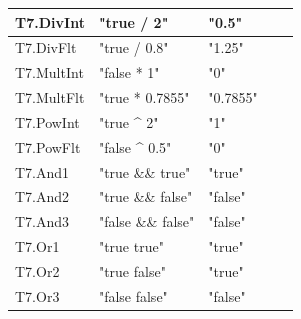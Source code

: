 \documentclass[a4paper, oneside, 11pt]{report}
\begin{document}
\begin{tabular}{|p{1.5in}|p{1.5in}|p{1.6in}|p{1.6in}|p{2.4in}|}
        \hline
        T7.DivInt                         & "true / 2"                              & "0.5"         &                \\
        \hline
        T7.DivFlt                         & "true / 0.8"                            & "1.25"        &                \\
        \hline
        T7.MultInt                        & "false * 1"                             & "0"           &                \\
        \hline
        T7.MultFlt                        & "true * 0.7855"                         & "0.7855"      &                \\
        \hline
        T7.PowInt                         & "true \^{} 2"                           & "1"        &                \\
        \hline
        T7.PowFlt                         & "false \^{} 0.5"                        & "0"        &                \\
        \hline
        T7.And1                           & "true \&\& true"                            & "true"        &                \\
        \hline
        T7.And2                           & "true \&\& false"                           & "false"       &                \\
        \hline
        T7.And3                           & "false \&\& false"                          & "false"       &                \\
        \hline
        T7.Or1                            & "true \textbar{}\textbar{} true"        & "true"        &                \\
        \hline
        T7.Or2                            & "true \textbar{}\textbar{} false"       & "true"        &                \\
        \hline
        T7.Or3                            & "false \textbar{}\textbar{} false"      & "false"       &                \\

\end{tabular}
\end{document}
